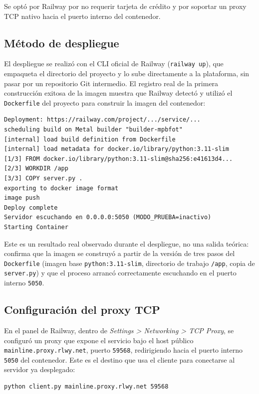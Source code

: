 \documentclass[12pt,a4paper]{article}
\begin{document}
Se optó por Railway por no requerir tarjeta de crédito y por soportar un proxy TCP nativo hacia el puerto interno del contenedor.

\subsection{Método de despliegue}

El despliegue se realizó con el CLI oficial de Railway (\texttt{railway up}), que empaqueta el directorio del proyecto y lo sube directamente a la plataforma, sin pasar por un repositorio Git intermedio. El registro real de la primera construcción exitosa de la imagen muestra que Railway detectó y utilizó el \texttt{Dockerfile} del proyecto para construir la imagen del contenedor:

\begin{lstlisting}[style=consola]
Deployment: https://railway.com/project/.../service/...
scheduling build on Metal builder "builder-mpbfot"
[internal] load build definition from Dockerfile
[internal] load metadata for docker.io/library/python:3.11-slim
[1/3] FROM docker.io/library/python:3.11-slim@sha256:e41613d4...
[2/3] WORKDIR /app
[3/3] COPY server.py .
exporting to docker image format
image push
Deploy complete
Servidor escuchando en 0.0.0.0:5050 (MODO_PRUEBA=inactivo)
Starting Container
\end{lstlisting}

Este es un resultado real observado durante el despliegue, no una salida teórica: confirma que la imagen se construyó a partir de la versión de tres pasos del \texttt{Dockerfile} (imagen base \texttt{python:3.11-slim}, directorio de trabajo \texttt{/app}, copia de \texttt{server.py}) y que el proceso arrancó correctamente escuchando en el puerto interno \texttt{5050}.

\subsection{Configuración del proxy TCP}

En el panel de Railway, dentro de \textit{Settings > Networking > TCP Proxy}, se configuró un proxy que expone el servicio bajo el host público \texttt{mainline.proxy.rlwy.net}, puerto \texttt{59568}, redirigiendo hacia el puerto interno \texttt{5050} del contenedor. Este es el destino que usa el cliente para conectarse al servidor ya desplegado:

\begin{lstlisting}[style=consola]
python client.py mainline.proxy.rlwy.net 59568
\end{lstlisting}
\end{document}
